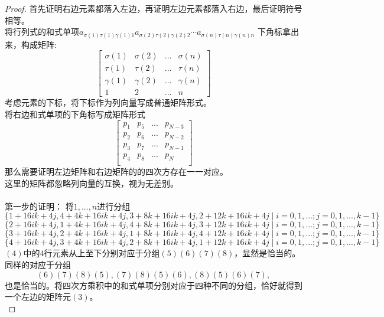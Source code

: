 \documentclass[twoside,a4paper,CCT]{cctart}   %
\begin{document}
\begin{proof}
首先证明右边元素都落入左边，再证明左边元素都落入右边，最后证明符号相等。\\
将行列式的和式单项$a_{\sigma(1)\tau(1)\gamma(1)1} a_{\sigma(2)\tau(2)\gamma(2)2}\cdots a_{\sigma(n)\tau(n)\gamma(n)n}$ 下角标拿出来，构成矩阵:
\begin{equation}\begin{bmatrix}\sigma(1)&\sigma(2)&...&\sigma(n)\\\tau(1)&\tau(2)&...&\tau(n)\\\gamma(1)&\gamma(2)&...&\gamma(n)\\
1&2&...&n\end{bmatrix}\end{equation}
考虑元素的下标，将下标作为列向量写成普通矩阵形式。\\
将右边和式单项的下角标写成矩阵形式\begin{equation}\begin{bmatrix}p_{1}&p_{5}&...&p_{N-3}\\p_{2}&p_{6}&...&p_{N-2}\\p_{3}&p_{7}&...&p_{N-1}\\p_{4}&p_{8}&...&p_{N}\\\end{bmatrix}\end{equation}
那么需要证明左边矩阵和右边矩阵的的四次方存在一一对应。\\
这里的矩阵都忽略列向量的互换，视为无差别。\\\\
第一步的证明：
将$1,...,n$进行分组
\begin{equation}\{1+16ik+4j,4+4k+16ik+4j,3+8k+16ik+4j,2+12k+16ik+4j \mid i=0,1,...;j=0,1,...,k-1\}\end{equation}
\begin{equation}\{2+16ik+4j,1+4k+16ik+4j,4+8k+16ik+4j,3+12k+16ik+4j \mid i=0,1,...;j=0,1,...,k-1\}\end{equation}
\begin{equation}\{3+16ik+4j,2+4k+16ik+4j,1+8k+16ik+4j,4+12k+16ik+4j \mid i=0,1,...;j=0,1,...,k-1\}\end{equation}
\begin{equation}\{4+16ik+4j,3+4k+16ik+4j,2+8k+16ik+4j,1+12k+16ik+4j \mid i=0,1,...;j=0,1,...,k-1\}\end{equation}
$(4)$中的$4$行元素从上至下分别对应于分组$(5)(6)(7)(8)$，显然是恰当的。同样的对应于分组
$$(6)(7)(8)(5),(7)(8)(5)(6),(8)(5)(6)(7),$$也是恰当的。将四次方乘积中的和式单项分别对应于四种不同的分组，恰好就得到一个左边的矩阵元$(3)$。\\

\end{proof}
\end{document}
